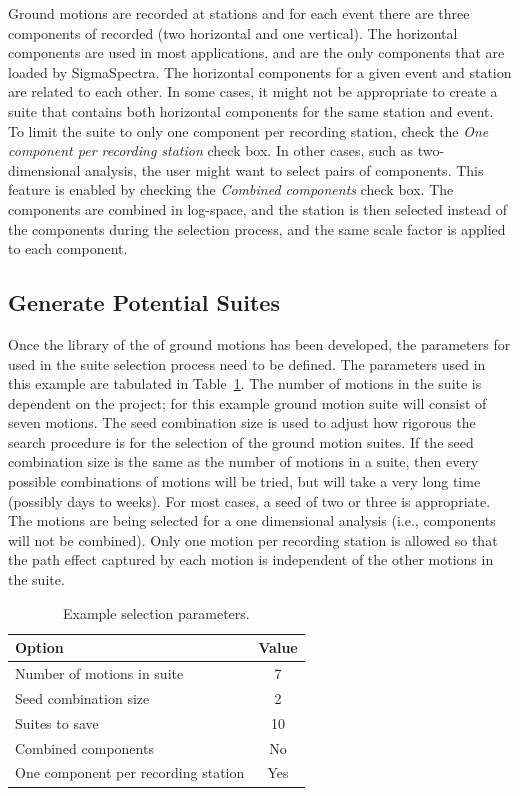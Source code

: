 \documentclass[11pt]{article}
\begin{document}
Ground motions are recorded at stations and for each event there are three
components of recorded (two horizontal and one vertical). The horizontal
components are used in most applications, and are the only components that are
loaded by SigmaSpectra. The horizontal components for a given event and station
are related to each other. In some cases, it might not be appropriate to create
a suite that contains both horizontal components for the same station and event.
To limit the suite to only one component per recording station, check the
\emph{One component per recording station} check box. In other cases, such as
two-dimensional analysis, the user might want to select pairs of components.
This feature is enabled by checking the \emph{Combined components} check box.
The components are combined in log-space, and the station is then selected
instead of the components during the selection process, and the same scale
factor is applied to each component.

\subsection{Generate Potential Suites}

Once the library of the of ground motions has been developed, the parameters for
used in the suite selection process need to be defined. The parameters used in
this example are tabulated in Table~\ref{tab:example:selectionParams}. The
number of motions in the suite is dependent on the project; for this example
ground motion suite will consist of seven motions. The seed combination size is
used to adjust how rigorous the search procedure is for the selection of the
ground motion suites. If the seed combination size is the same as the number of
motions in a suite, then every possible combinations of motions will be tried,
but will take a very long time (possibly days to weeks).  For most cases, a seed
of two or three is appropriate. The motions are being selected for a one
dimensional analysis (i.e., components will not be combined). Only one motion
per recording station is allowed so that the path effect captured by each motion
is independent of the other motions in the suite.

\begin{table}
  \centering
  \begin{tabular}{lc}
	\hline\hline
	\textbf{Option} & \textbf{Value}\\
	\hline
	Number of motions in suite & 7 \\
	Seed combination size & 2 \\
	Suites to save & 10 \\
	Combined components & No \\
	One component per recording station & Yes \\
	\hline\hline
  \end{tabular}
  \caption{Example selection parameters.}
  \label{tab:example:selectionParams}
\end{table}
\end{document}
